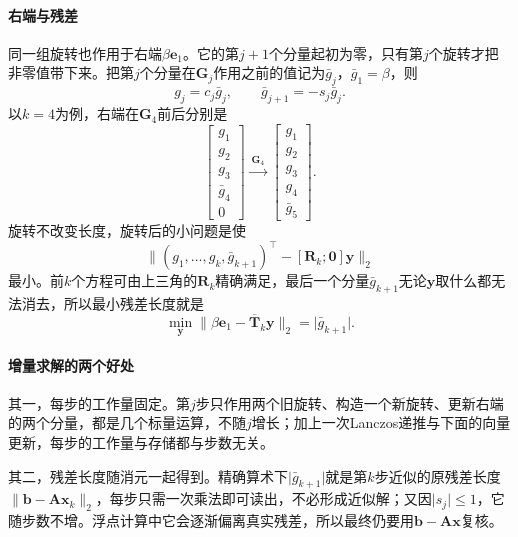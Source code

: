 \paragraph{右端与残差}
同一组旋转也作用于右端$\beta\bm e_1$。它的第$j+1$个分量起初为零，只有第$j$个旋转才把非零值带下来。把第$j$个分量在$\bm G_j$作用之前的值记为$\bar g_j$，$\bar g_1=\beta$，则
\begin{equation}
 g_j=c_j\bar g_j,\qquad \bar g_{j+1}=-s_j\bar g_j .
 \label{eq:ls-minres-rhs}
\end{equation}
以$k=4$为例，右端在$\bm G_4$前后分别是
\[
 \begin{bmatrix}g_1\\g_2\\g_3\\\bar g_4\\0\end{bmatrix}
 \xrightarrow{\ \bm G_4\ }
 \begin{bmatrix}g_1\\g_2\\g_3\\g_4\\\bar g_5\end{bmatrix}.
\]
旋转不改变长度，旋转后的小问题是使
\[
 \bigl\lVert(g_1,\ldots,g_k,\bar g_{k+1})^\top-[\bm R_k;\bm 0]\bm y\bigr\rVert_2
\]
最小。前$k$个方程可由上三角的$\bm R_k$精确满足，最后一个分量$\bar g_{k+1}$无论$\bm y$取什么都无法消去，所以最小残差长度就是
\begin{equation}
 \min_{\bm y}\lVert\beta\bm e_1-\overline{\bm T}_k\bm y\rVert_2=\lvert\bar g_{k+1}\rvert .
 \label{eq:ls-minres-residual-estimate}
\end{equation}

\paragraph{增量求解的两个好处}
其一，每步的工作量固定。第$j$步只作用两个旧旋转、构造一个新旋转、更新右端的两个分量，都是几个标量运算，不随$j$增长；加上一次Lanczos递推与下面的向量更新，每步的工作量与存储都与步数无关。

其二，残差长度随消元一起得到。精确算术下$\lvert\bar g_{k+1}\rvert$就是第$k$步近似的原残差长度$\lVert\bm b-\bm A\bm x_k\rVert_2$，每步只需一次乘法即可读出，不必形成近似解；又因$\lvert s_j\rvert\le1$，它随步数不增。浮点计算中它会逐渐偏离真实残差，所以最终仍要用$\bm b-\bm A\bm x$复核。

